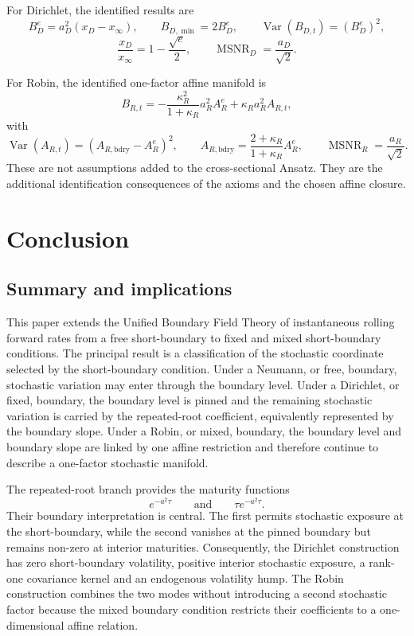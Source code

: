 \documentclass[12pt]{article}
\numberwithin{equation}{subsection}
\newcommand{\Var}{\operatorname{Var}}
\newcommand{\MSNR}{\operatorname{MSNR}}
\begin{document}
For Dirichlet, the identified results are
\begin{equation}
B_D^e=a_D^2(x_D-x_\infty),
\qquad
B_{D,\min}=2B_D^e,
\qquad
\Var(B_{D,t})=(B_D^e)^2,
\end{equation}
\begin{equation}
\frac{x_D}{x_\infty}=1-\frac{\sqrt e}{2},
\qquad
\MSNR_D=\frac{a_D}{\sqrt2}.
\end{equation}

For Robin, the identified one-factor affine manifold is
\begin{equation}
B_{R,t}
=
-\frac{\kappa_R^2}{1+\kappa_R}a_R^2A_R^e
+
\kappa_Ra_R^2A_{R,t},
\end{equation}
with
\begin{equation}
\Var(A_{R,t})=(A_{R,\mathrm{bdry}}-A_R^e)^2,
\qquad
A_{R,\mathrm{bdry}}
=
\frac{2+\kappa_R}{1+\kappa_R}A_R^e,
\qquad
\MSNR_R=\frac{a_R}{\sqrt2}.
\end{equation}
These are not assumptions added to the cross-sectional Ansatz. They are the additional identification consequences of the axioms and the chosen affine closure.



\section{Conclusion}
\subsection{Summary and implications}

This paper extends the Unified Boundary Field Theory of instantaneous rolling forward rates from a free short-boundary to fixed and mixed short-boundary conditions. The principal result is a classification of the stochastic coordinate selected by the short-boundary condition. Under a Neumann, or free, boundary, stochastic variation may enter through the boundary level. Under a Dirichlet, or fixed, boundary, the boundary level is pinned and the remaining stochastic variation is carried by the repeated-root coefficient, equivalently represented by the boundary slope. Under a Robin, or mixed, boundary, the boundary level and boundary slope are linked by one affine restriction and therefore continue to describe a one-factor stochastic manifold.

The repeated-root branch provides the maturity functions
\begin{equation}
e^{-a^2\tau}
\qquad\text{and}\qquad
\tau e^{-a^2\tau}.
\end{equation}
Their boundary interpretation is central. The first permits stochastic exposure at the short-boundary, while the second vanishes at the pinned boundary but remains non-zero at interior maturities. Consequently, the Dirichlet construction has zero short-boundary volatility, positive interior stochastic exposure, a rank-one covariance kernel and an endogenous volatility hump. The Robin construction combines the two modes without introducing a second stochastic factor because the mixed boundary condition restricts their coefficients to a one-dimensional affine relation.
\end{document}
